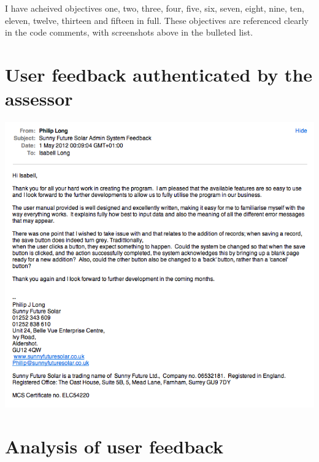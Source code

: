 I have acheived objectives one, two, three, four, five, six, seven, eight,
nine, ten, eleven, twelve, thirteen and fifteen in full.  These objectives are referenced clearly in the code comments, with screenshots above in the bulleted list.

	\section{User feedback authenticated by the assessor}
	
\includegraphics[scale=0.65]{user_feedback_scrot}
	
	\section{Analysis of user feedback}
	

